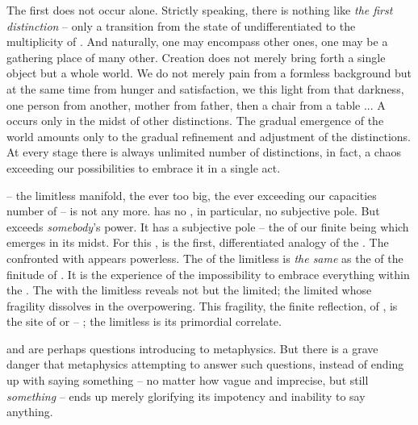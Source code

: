 The first  does not occur alone. Strictly speaking, there is
nothing like {\em the first distinction} -- only a transition from the state of
undifferentiated  to the multiplicity of . And
naturally, one  may encompass other ones, one 
may be a gathering place of many other.  Creation does not merely bring forth a
single object but a whole world. We do not merely  pain from a
formless background but at the same time from hunger and satisfaction, we
 this light from that darkness, one person from another, mother
from father, then a chair from a table ...  A  occurs only in
the midst of other distinctions.  The gradual emergence of the world amounts
only to the gradual refinement and adjustment of the distinctions. At every
stage there is always unlimited number of distinctions, in fact, a chaos
exceeding our possibilities to embrace it in a single act.

 -- the limitless manifold, the ever too big, the ever exceeding
our capacities number of  -- is not  any more.
 has no , in particular, no subjective pole.
But  exceeds {\em somebody}'s power.  It has a subjective pole -- the
 of our finite being which emerges in its midst. For this
,  is the first, differentiated analogy of the
.
The  confronted with  appears powerless.  The
 of the limitless  is {\em the same} as the
 of the finitude of . It is the experience of
the impossibility to embrace everything within the \hoa.  The 
with the limitless reveals not  but the limited; the limited
whose fragility dissolves in the overpowering.  This fragility, the finite
reflection,  of , is the site of  or --
; the limitless is its primordial correlate.


\pa {} and  are perhaps questions introducing to
metaphysics. But there is a grave danger that metaphysics attempting to answer such
questions, instead of ending up with saying something -- no matter how vague and
imprecise, but still {\em something} -- ends up merely glorifying its impotency and
inability to say anything.

